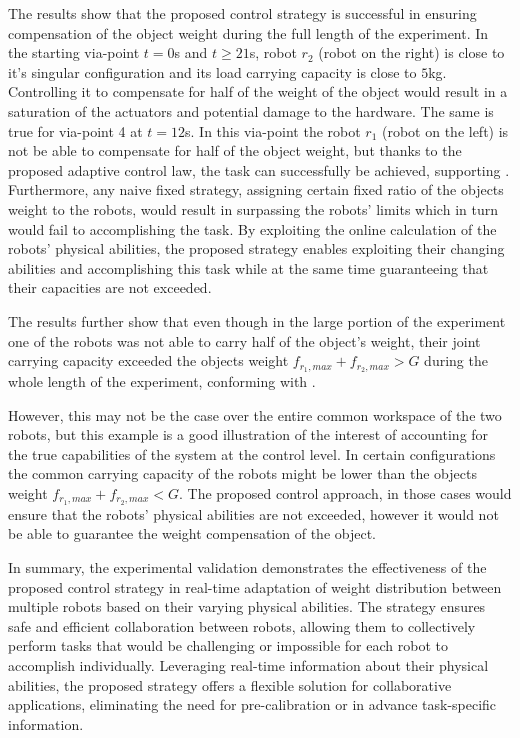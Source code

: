 The results show that the proposed control strategy is successful in ensuring compensation of the object weight during the full length of the experiment. In the starting via-point $t=0$s and $t\geq21$s, robot $r_2$ (robot on the right) is close to it's singular configuration and its load carrying capacity is close to $5$kg. Controlling it to compensate for half of the weight of the object would result in a saturation of the actuators and potential damage to the hardware. The same is true for via-point 4 at $t=12$s. In this via-point the robot $r_1$ (robot on the left) is not be able to compensate for half of the object weight, but thanks to the proposed adaptive control law, the task can successfully be achieved, supporting . 
Furthermore, any naive fixed strategy, assigning certain fixed ratio of the objects weight to the robots, would result in surpassing the robots' limits which in turn would fail to accomplishing the task. 
By exploiting the online calculation of the robots' physical abilities, the proposed strategy enables exploiting their changing abilities and accomplishing this task while at the same time guaranteeing that their capacities are not exceeded. 

The results further show that even though in the large portion of the experiment one of the robots was not able to carry half of the object's weight, their joint carrying capacity exceeded the objects weight $f_{r_1,max}+f_{r_2,max} >G$ during the whole length of the experiment, conforming with .

However, this may not be the case over the entire common workspace of the two robots, but this example is a good illustration of the interest of accounting for the true capabilities of the system at the control level.  In certain configurations the common carrying capacity of the robots might be lower than the objects weight $f_{r_1,max}+f_{r_2,max} <G$. The proposed control approach, in those cases would ensure that the robots' physical abilities are not exceeded, however it would not be able to guarantee the weight compensation of the object. 

In summary, the experimental validation demonstrates the effectiveness of the proposed control strategy in real-time adaptation of weight distribution between multiple robots based on their varying physical abilities. The strategy ensures safe and efficient collaboration between robots, allowing them to collectively perform tasks that would be challenging or impossible for each robot to accomplish individually. Leveraging real-time information about their physical abilities, the proposed strategy offers a flexible solution for collaborative applications, eliminating the need for pre-calibration or in advance task-specific information.

